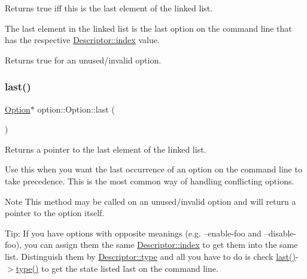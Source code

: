 Returns true iff this is the last element of the linked list. 

The last element in the linked list is the last option on the command line that has the respective \hyperlink{structoption_1_1_descriptor_a1fee8ac44f529c99ac2b1149b4c391b1}{Descriptor\+::index} value.

Returns true for an unused/invalid option. \mbox{\label{classoption_1_1_option_afe2aff68191e55b59c53fac3dbbcd7c3}} 
\subsubsection{\texorpdfstring{last()}{last()}\hspace{0.1cm}{\footnotesize\ttfamily [1/2]}}
{\footnotesize\ttfamily \hyperlink{classoption_1_1_option}{Option}$\ast$ option\+::\+Option\+::last (\begin{DoxyParamCaption}{ }\end{DoxyParamCaption})\hspace{0.3cm}{\ttfamily [inline]}}



Returns a pointer to the last element of the linked list. 

Use this when you want the last occurrence of an option on the command line to take precedence. This is the most common way of handling conflicting options.

\begin{DoxyNote}{Note}
This method may be called on an unused/invalid option and will return a pointer to the option itself.
\end{DoxyNote}
\begin{DoxyParagraph}{Tip\+:}
If you have options with opposite meanings (e.\+g. {\ttfamily --enable-\/foo} and {\ttfamily --disable-\/foo}), you can assign them the same \hyperlink{structoption_1_1_descriptor_a1fee8ac44f529c99ac2b1149b4c391b1}{Descriptor\+::index} to get them into the same list. Distinguish them by \hyperlink{structoption_1_1_descriptor_a1b220dabd8aad075fa441a80f9b9343c}{Descriptor\+::type} and all you have to do is check {\ttfamily  \hyperlink{classoption_1_1_option_afe2aff68191e55b59c53fac3dbbcd7c3}{last()}-\/$>$\hyperlink{classoption_1_1_option_a5268a69e1a91137186ab772574296da0}{type()} } to get the state listed last on the command line. 
\end{DoxyParagraph}
\mbox{\label{classoption_1_1_option_ab43ac99bffdb74bec54f62cf50b74975}} 
